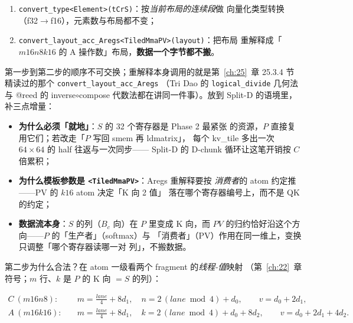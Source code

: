 \begin{enumerate}[itemsep=2pt,topsep=2pt]
  \item \texttt{convert\_\allowbreak{}type\allowbreak{}<Element>\allowbreak{}(t\allowbreak{}Cr\allowbreak{}S)}：按\emph{当前布局的连续段}做
        向量化类型转换（f32$\to$f16），元素数与布局都不变；
  \item \texttt{convert\_\allowbreak{}layout\_\allowbreak{}acc\_\allowbreak{}Aregs\allowbreak{}<Tiled\allowbreak{}Mma\allowbreak{}PV>\allowbreak{}(layout)}：把布局
        重解释成「$m16n8k16$ 的 A 操作数」布局，\textbf{数据一个字节都不搬}。
\end{enumerate}

第一步到第二步的顺序不可交换；重解释本身调用的就是第~\ref{ch:25}~章
25.3.4 节精读过的那个 \texttt{convert\_\allowbreak{}layout\_\allowbreak{}acc\_\allowbreak{}Aregs}
（Tri Dao 的 \texttt{logical\_\allowbreak{}divide} 几何法与 @reed 的
inverse$\circ$compose 代数法都在讲同一件事）。放到 Split-D 的语境里，
补三点增量：

\begin{itemize}[itemsep=2pt,topsep=2pt]
  \item \textbf{为什么必须「就地」}：$S$ 的 32 个寄存器是 Phase 2 最紧张
        的资源，$P$ 直接复用它们；若改走「$P$ 写回 smem 再 ldmatrix」，
        每个 kv\_tile 多出一次 $64\times64$ 的 half 往返与一次同步——
        Split-D 的 D-chunk 循环让这笔开销按 $C$ 倍累积；
  \item \textbf{为什么模板参数是 \texttt{\allowbreak{}<Tiled\allowbreak{}Mma\allowbreak{}PV>}}：Aregs 重解释要按
        \emph{消费者}的 atom 约定推——PV 的 $k16$ atom 决定「K 向 2 值」
        落在哪个寄存器编号上，而不是 QK 的约定；
  \item \textbf{数据流本身}：$S$ 的列（$B_c$ 向）在 $P$ 里变成 K 向，而
        $PV$ 的归约恰好沿这个方向——$P$ 的「生产者」（softmax）与
        「消费者」（PV）作用在同一维上，变换只调整「哪个寄存器读哪一对
        列」，不搬数据。
\end{itemize}

第二步为什么合法？在 atom 一级看两个 fragment 的\emph{线程-值}映射
（第~\ref{ch:22}~章符号；$m$ 行、$k$ 是 $P$ 的 K 向 $=S$ 的列）：

\begin{align}
  C\ (m16n8):\quad & m = \frac{lane}{4} + 8d_1,\quad
    n = 2\,(lane\bmod 4) + d_0, \qquad v = d_0 + 2d_1, \label{eq:26-cmap}\\
  A\ (m16k16):\quad & m = \frac{lane}{4} + 8d_1,\quad
    k = 2\,(lane\bmod 4) + d_0 + 8d_2, \qquad v = d_0 + 2d_1 + 4d_2 .
  \label{eq:26-amap}
\end{align}

